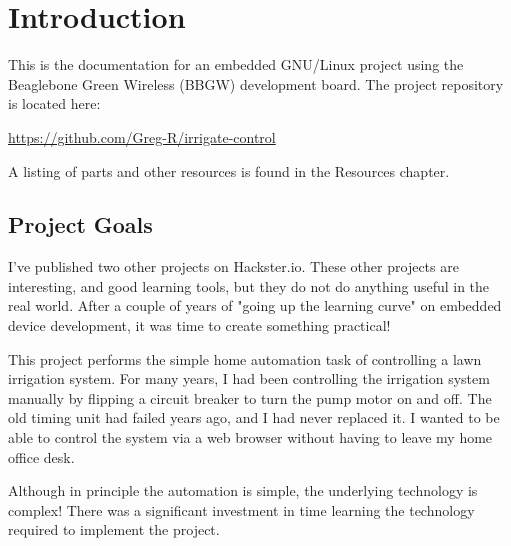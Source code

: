 %
%
%

\chapter{Introduction}

This is the documentation for an embedded GNU/Linux project using the 
Beaglebone Green Wireless (BBGW) development board.  The project repository is 
located here:

\url{https://github.com/Greg-R/irrigate-control}

A listing of parts and other resources is found in the Resources chapter.

\section{Project Goals}

I've published two other projects on Hackster.io.  These other projects are 
interesting, and good learning tools, but they do not do anything useful in the 
real world.  After a couple of years of "going up the learning curve" on 
embedded device development, it was time to create something practical!

This project performs the simple home automation task of controlling a lawn 
irrigation system.  For many years, I had been controlling the irrigation 
system manually by flipping a circuit breaker to turn the pump motor on and 
off.  The old timing unit had failed years ago, and I had never replaced it.  
I wanted to be able to control the system via a web browser without 
having to leave my home office desk.

Although in principle the automation is simple, the underlying technology is 
complex!  There was a significant investment in time learning the technology 
required to implement the project.

